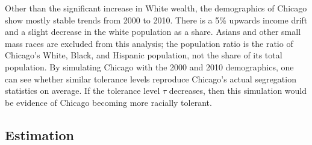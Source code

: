 \documentclass[11pt]{asaproc}
\newcommand{\1}{\mathbb{1}}
\begin{document}
\begin{table}[h!]
\centering
\caption{Demographics of Chicago}
\label{tab:chicago}
\end{table}

Other than the significant increase in White wealth, the demographics of Chicago show mostly stable trends from 2000 to 2010. There is a 5\% upwards income drift and a slight decrease in the white population as a share. Asians and other small mass races are excluded from this analysis; the population ratio is the ratio of Chicago's White, Black, and Hispanic population, not the share of its total population. By simulating Chicago with the 2000 and 2010 demographics, one can see whether similar tolerance levels reproduce Chicago's actual segregation statistics on average. If the tolerance level $\tau$ decreases, then this simulation would be evidence of Chicago becoming more racially tolerant. 

\subsection{Estimation}
\end{document}
